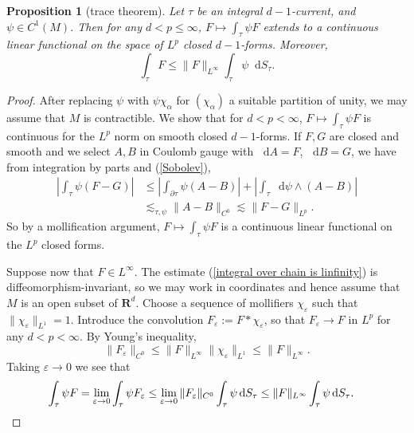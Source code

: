 \documentclass[reqno,11pt]{amsart}
\newcommand{\RR}{\mathbf{R}}
\newcommand*\dif{\mathop{}\!\mathrm{d}}
\newtheorem{proposition}[theorem]{Proposition}
\theoremstyle{definition}
\numberwithin{equation}{section}
\begin{document}
\begin{proposition}[trace theorem]\label{integration is welldefined}
Let $\tau$ be an integral $d-1$-current, and $\psi \in C^1(M)$.
Then for any $d < p \leq \infty$, $F \mapsto \int_\tau \psi F$ extends to a continuous linear functional on the space of $L^p$ closed $d-1$-forms.
Moreover,
\begin{equation}\label{integral over chain is linfinity}
	\int_\tau F \leq \|F\|_{L^\infty} \int_\tau \psi \dif S_\tau.
\end{equation}
\end{proposition}
\begin{proof}
After replacing $\psi$ with $\psi \chi_\alpha$ for $(\chi_\alpha)$ a suitable partition of unity, we may assume that $M$ is contractible.
We show that for $d < p < \infty$, $F \mapsto \int_\tau \psi F$ is continuous for the $L^p$ norm on smooth closed $d-1$-forms.
If $F, G$ are closed and smooth and we select $A, B$ in Coulomb gauge with $\dif A = F$, $\dif B = G$, we have from integration by parts and (\ref{Sobolev}),
\begin{align*}
	\left|\int_\tau \psi(F - G)\right| 
	&\leq \left|\int_{\partial \tau} \psi (A - B)\right| + \left|\int_\tau \dif \psi \wedge (A - B)\right| \\
	&\lesssim_{\tau, \psi} \|A - B\|_{C^0} \lesssim \|F - G\|_{L^p}.
\end{align*}
So by a mollification argument, $F \mapsto \int_\tau \psi F$ is a continuous linear functional on the $L^p$ closed forms.

Suppose now that $F \in L^\infty$.
The estimate (\ref{integral over chain is linfinity}) is diffeomorphism-invariant, so we may work in coordinates and hence assume that $M$ is an open subset of $\RR^d$.
Choose a sequence of mollifiers $\chi_\varepsilon$ such that $\|\chi_\varepsilon\|_{L^1} = 1$.
Introduce the convolution $F_\varepsilon := F * \chi_\varepsilon$, so that $F_\varepsilon \to F$ in $L^p$ for any $d < p < \infty$.
By Young's inequality, 
$$\|F_\varepsilon\|_{C^0} \leq \|F\|_{L^\infty} \|\chi_\varepsilon\|_{L^1} \leq \|F\|_{L^\infty}.$$
Taking $\varepsilon \to 0$ we see that
\begin{align*}
\int_\tau \psi F 
&= \lim_{\varepsilon \to 0} \int_\tau \psi F_\varepsilon \leq \lim_{\varepsilon \to 0} \|F_\varepsilon\|_{C^0} \int_\tau \psi \dif S_\tau \leq \|F\|_{L^\infty} \int_\tau \psi \dif S_\tau. \qedhere
\end{align*}
\end{proof}
\end{document}
